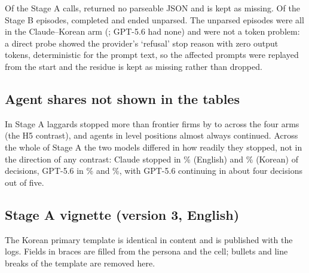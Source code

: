 \documentclass[preprint,12pt,authoryear]{elsarticle}
\begin{document}
Of the \StageACalls{} Stage A calls, \StageAParseFail{} returned no parseable JSON and is kept as missing. Of the \StageBEpisodes{} Stage B episodes, \StageBComplete{} completed and \StageBParseFailed{} ended unparsed. The unparsed episodes were all in the Claude--Korean arm (\StageBFailedFaKo; GPT-5.6 had none) and were not a token problem: a direct probe showed the provider's `refusal' stop reason with zero output tokens, deterministic for the prompt text, so the affected prompts were replayed from the start and the residue is kept as missing rather than dropped.

\subsection{Agent shares not shown in the tables}
\label{app:agentshares}

In Stage A laggards stopped more than frontier firms by \SAHFiveMin{} to \SAHFiveMax{} across the four arms (the H5 contrast), and agents in level positions almost always continued. Across the whole of Stage A the two models differed in how readily they stopped, not in the direction of any contrast: Claude stopped in \SAOverallQuitFaEnPct\% (English) and \SAOverallQuitFaKoPct\% (Korean) of decisions, GPT-5.6 in \SAOverallQuitGpEnPct\% and \SAOverallQuitGpKoPct\%, with GPT-5.6 continuing in about four decisions out of five.


\subsection{Stage A vignette (version 3, English)}
\label{app:vignette}

The Korean primary template is identical in content and is published with the logs. Fields in braces are filled from the persona and the cell; bullets and line breaks of the template are removed here.
\end{document}
